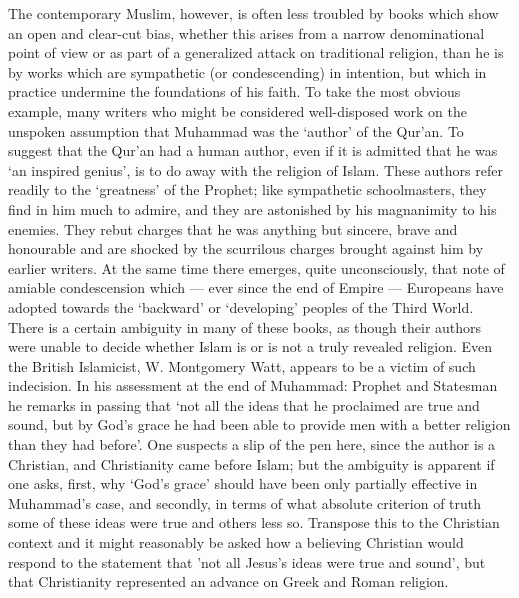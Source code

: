 \documentclass[10pt, twoside]{book}
\begin{document}
The contemporary Muslim, however, is often less troubled by books which show an open and clear\hyp{}cut bias, whether this arises from a narrow denominational point of view or as part of a generalized attack on traditional religion, than he is by works which are sympathetic (or condescending) in intention, but which in practice undermine the foundations of his faith. To take the most obvious example, many writers who might be considered well\hyp{}disposed work on the unspoken assumption that Muhammad was the `author' of the Qur'an. To suggest that the Qur'an had a human author, even if it is admitted that he was `an inspired genius', is to do away with the religion of Islam. These authors refer readily to the `greatness' of the Prophet; like sympathetic schoolmasters, they find in him much to admire, and they are astonished by his magnanimity to his enemies. They rebut charges that he was anything but sincere, brave and honourable and are shocked by the scurrilous charges brought against him by earlier writers. At the same time there emerges, quite unconsciously, that note of amiable condescension which --- ever since the end of Empire --- Europeans have adopted towards the `backward' or `developing' peoples of the Third World. \\

There is a certain ambiguity in many of these books, as though their authors were unable to decide whether Islam is or is not a truly revealed religion. Even the British Islamicist, W. Montgomery Watt, appears to be a victim of such indecision. In his assessment at the end of Muhammad: Prophet and Statesman he remarks in passing that `not all the ideas that he proclaimed are true and sound, but by God's grace he had been able to provide men with a better religion than they had before'. One suspects a slip of the pen here, since the author is a Christian, and Christianity came before Islam; but the ambiguity is apparent if one asks, first, why `God's grace' should have been only partially effective in Muhammad's case, and secondly, in terms of what absolute criterion of truth some of these ideas were true and others less so. Transpose this to the Christian context and it might reasonably be asked how a believing Christian would respond to the statement that 'not all Jesus's ideas were true and sound', but that Christianity represented an advance on Greek and Roman religion. \\
\end{document}

